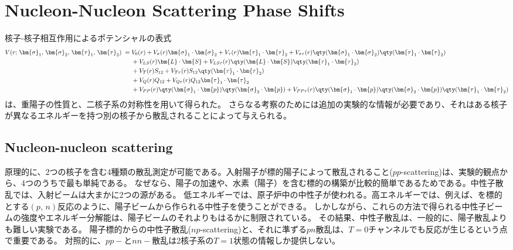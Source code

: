 \documentclass[a4paper,11pt,uplatex]{jsarticle}
\begin{document}
\newpage
\section{Nucleon-Nucleon Scattering Phase Shifts}
核子-核子相互作用によるポテンシャルの表式
\begin{align}
  V(r;\,\bm{\sigma}_1,\,\bm{\sigma}_2,\,\bm{\tau}_1,\,\bm{\tau}_2) \;=\; &
  V_0(r)+V_\sigma(r)\bm{\sigma}_1\cdot\bm{\sigma}_2 + V_\tau(r)\bm{\tau}_1\cdot\bm{\tau}_2
  + V_{\sigma\tau}(r)\qty(\bm{\sigma}_1\cdot\bm{\sigma}_2)\qty(\bm{\tau}_1\cdot\bm{\tau}_2) \notag                                                    \\
                                                                         & +V_{LS}(r)\bm{L}\cdot\bm{S} +
  V_{LS\tau}(r)\qty(\bm{L}\cdot\bm{S})\qty(\bm{\tau}_1\cdot\bm{\tau}_2) \notag                                                                        \\
                                                                         & +V_{T}(r)S_{12}+V_{T\tau}(r)S_{12}\qty(\bm{\tau}_1\cdot\bm{\tau}_2) \notag \\
                                                                         & +V_Q(r)Q_{12}+V_{Q\tau}(r)Q_{12}\bm{\tau}_1\cdot\bm{\tau}_2 \notag         \\
                                                                         & + V_{PP}(r)\qty(\bm{\sigma}_1\cdot\bm{p})\qty(\bm{\sigma}_2\cdot\bm{p})
  +V_{PP\tau}(r)\qty(\bm{\sigma}_1\cdot\bm{p})\qty(\bm{\sigma}_2\cdot\bm{p})\qty(\bm{\tau}_1\cdot\bm{\tau}_2)
\end{align}
は、重陽子の性質と、二核子系の対称性を用いて得られた。
さらなる考察のためには追加の実験的な情報が必要であり、それはある核子が異なるエネルギーを持つ別の核子から散乱されることによって与えられる。

\subsection*{Nucleon-nucleon scattering}
原理的に、2つの核子を含む4種類の散乱測定が可能である。入射陽子が標的陽子によって散乱されること($pp$-scattering)は、実験的観点から、4つのうちで最も単純である。
なぜなら、陽子の加速や、水素（陽子）を含む標的の構築が比較的簡単であるためである。中性子散乱では、入射ビームは大まかに2つの源がある。
低エネルギーでは、原子炉中の中性子が使われる。高エネルギーでは、例えば、を標的とする$(p,\,n)$反応のように、陽子ビームから作られる中性子を使うことができる。
しかしながら、これらの方法で得られる中性子ビームの強度やエネルギー分解能は、陽子ビームのそれよりもはるかに制限されている。
その結果、中性子散乱は、一般的に、陽子散乱よりも難しい実験である。
陽子標的からの中性子散乱($np$-scattering)と、それに準ずる$pn$散乱は、$T=0$チャンネルでも反応が生じるという点で重要である。
対照的に、$pp-$と$nn-$散乱は2核子系の$T=1$状態の情報しか提供しない。
\end{document}
